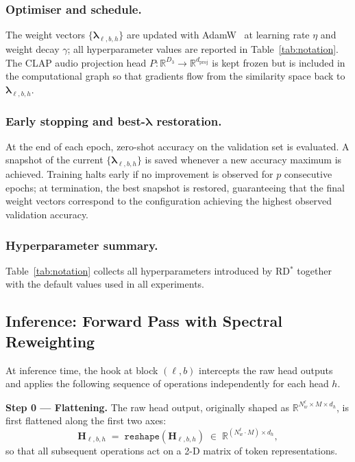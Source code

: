 \subsubsection{Optimiser and schedule.}
The weight vectors $\{\boldsymbol{\lambda}_{\ell,b,h}\}$ are updated
with AdamW~\cite{adamw} at learning rate $\eta$ and
weight decay $\gamma$; all hyperparameter values are reported in
Table~\ref{tab:notation}. The CLAP audio projection head
$P : \mathbb{R}^{D_3} \to \mathbb{R}^{d_{\mathrm{proj}}}$ is kept
frozen but is included in the computational graph so that gradients
flow from the similarity space back to
$\boldsymbol{\lambda}_{\ell,b,h}$.

\subsubsection{Early stopping and best-$\boldsymbol{\lambda}$ restoration.}
At the end of each epoch, zero-shot accuracy on the validation set is
evaluated. A snapshot of the current
$\{\boldsymbol{\lambda}_{\ell,b,h}\}$ is saved whenever a new accuracy
maximum is achieved. Training halts early if no improvement is observed
for $p$ consecutive epochs; at termination, the best snapshot is
restored, guaranteeing that the final weight vectors correspond to the
configuration achieving the highest observed validation accuracy.

\subsubsection{Hyperparameter summary.}
Table~\ref{tab:notation} collects all hyperparameters introduced
by RD$^*$\xspace together with the default values used in all experiments.

\subsection{Inference: Forward Pass with Spectral Reweighting}
\label{app:forward_rw}
At inference time, the hook at block $(\ell, b)$ intercepts the raw head
outputs and applies the following sequence of operations independently
for each head $h$.

\textbf{Step 0 — Flattening.}
The raw head output, originally shaped as
$\mathbb{R}^{N_w^\ell \times M \times d_h}$, is first flattened along
the first two axes:
\begin{equation}
    \mathbf{H}_{\ell,b,h}
\;=\; \texttt{reshape}(\mathbf{H}_{\ell,b,h})
\;\in\; \mathbb{R}^{(N_w^\ell \cdot M) \times d_h},
\label{eq:rd_flatten}
\end{equation}
so that all subsequent operations act on a 2-D matrix of token
representations.

